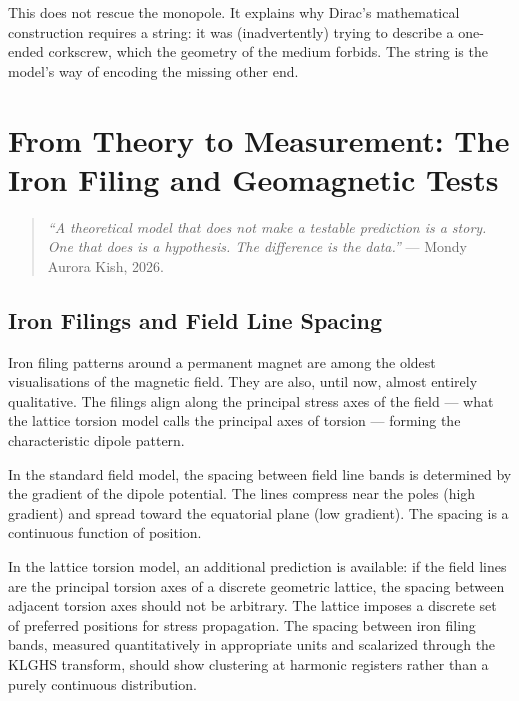 \documentclass[11pt, letterpaper, openany]{book}
\begin{document}
This does not rescue the monopole. It explains why Dirac's mathematical
construction requires a string: it was (inadvertently) trying to describe
a one-ended corkscrew, which the geometry of the medium forbids. The
string is the model's way of encoding the missing other end.

\clearpage

\chapter{From Theory to Measurement: The Iron Filing and Geomagnetic Tests}

\begin{quote}
\textit{``A theoretical model that does not make a testable prediction is
a story. One that does is a hypothesis. The difference is the data.''}
--- Mondy Aurora Kish, 2026.
\end{quote}

\section{Iron Filings and Field Line Spacing}

Iron filing patterns around a permanent magnet are among the oldest
visualisations of the magnetic field. They are also, until now, almost
entirely qualitative. The filings align along the principal stress axes
of the field --- what the lattice torsion model calls the principal axes
of torsion --- forming the characteristic dipole pattern.

In the standard field model, the spacing between field line bands is
determined by the gradient of the dipole potential. The lines compress
near the poles (high gradient) and spread toward the equatorial plane
(low gradient). The spacing is a continuous function of position.

In the lattice torsion model, an additional prediction is available:
if the field lines are the principal torsion axes of a discrete geometric
lattice, the spacing between adjacent torsion axes should not be arbitrary.
The lattice imposes a discrete set of preferred positions for stress
propagation. The spacing between iron filing bands, measured quantitatively
in appropriate units and scalarized through the KLGHS transform, should
show clustering at harmonic registers rather than a purely continuous
distribution.
\end{document}
